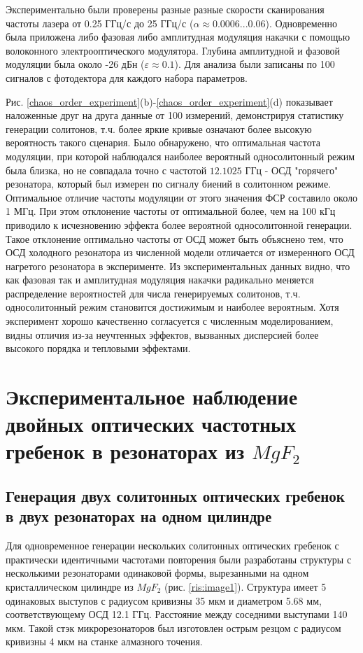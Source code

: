 Экспериментально были проверены разные разные скорости сканирования частоты лазера от 0.25 ГГц/с до 25 ГГц/с ($\alpha \approx 0.0006...0.06$). Одновременно была приложена либо фазовая либо амплитудная модуляция накачки с помощью волоконного электрооптического модулятора. Глубина амплитудной и фазовой модуляции была около -26 дБн ($\varepsilon \approx 0.1$). Для анализа были записаны по 100 сигналов с фотодектора для каждого набора параметров.

Рис. \ref{chaos_order_experiment}(b)-\ref{chaos_order_experiment}(d) показывает наложенные друг на друга данные от 100 измерений, демонстрируя статистику генерации солитонов, т.ч. более яркие кривые означают более высокую вероятность такого сценария. Было обнаружено, что оптимальная частота модуляции, при которой наблюдался наиболее вероятный односолитонный режим была близка, но не совпадала точно с частотой $12.1025$ ГГц - ОСД "горячего" резонатора, который был измерен по сигналу биений в солитонном режиме. Оптимальное отличие частоты модуляции от этого значения ФСР составило около 1 МГц. При этом отклонение частоты от оптимальной более, чем на 100 кГц приводило к исчезновению эффекта более вероятной односолитонной генерации. Такое отклонение оптимально частоты от ОСД может быть объяснено тем, что ОСД холодного резонатора из численной модели отличается от измеренного ОСД нагретого резонатора в эксперименте. Из экспериментальных данных видно, что как фазовая так и амплитудная модуляция накачки радикально меняется распределение вероятностей для числа генерируемых солитонов, т.ч. односолитонный режим становится достижимым и наиболее вероятным. Хотя эксперимент хорошо качественно согласуется с численным моделированием, видны отличия из-за неучтенных эффектов, вызванных дисперсией более высокого порядка и тепловыми эффектами.

\section{Экспериментальное наблюдение двойных оптических частотных гребенок в резонаторах из $MgF_2$}

\subsection{Генерация двух солитонных оптических гребенок в двух резонаторах на одном цилиндре}

Для одновременное генерации нескольких солитонных оптических гребенок с практически идентичными частотами повторения были разработаны структуры с несколькими резонаторами одинаковой формы, вырезанными на одном кристаллическом цилиндре из $MgF_2$ (рис. \ref{ris:image1}). Структура имеет 5 одинаковых выступов с радиусом кривизны 35 мкм и диаметром 5.68 мм, соответствующему ОСД 12.1 ГГц. Расстояние между соседними выступами 140 мкм. Такой стэк микрорезонаторов был изготовлен острым резцом с радиусом кривизны 4 мкм на станке алмазного точения.

